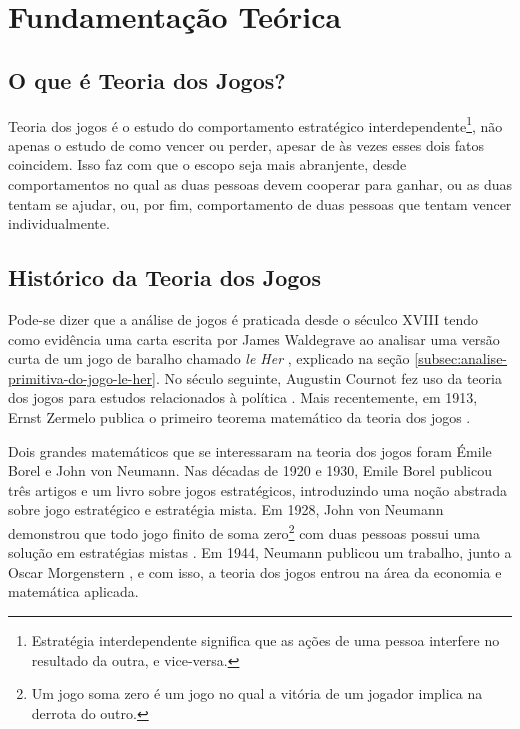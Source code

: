 \chapter[Fundamentação Teórica]{Fundamentação Teórica}
\label{cha:fundamentacao-teorica}

\section{O que é Teoria dos Jogos?}
\label{sec:o-que-e-teoria-dos-jogos}

Teoria dos jogos é o estudo do comportamento estratégico interdependente\footnote{Estratégia interdependente significa que as ações de uma pessoa interfere no resultado da outra, e vice-versa.}\cite{spaniel_2011}, não apenas o estudo de como vencer ou perder, apesar de às vezes esses dois fatos coincidem. Isso faz com que o escopo seja mais abranjente, desde comportamentos no qual as duas pessoas devem cooperar para ganhar, ou as duas tentam se ajudar, ou, por fim, comportamento de duas pessoas que tentam vencer individualmente.

\section{Histórico da Teoria dos Jogos}
\label{sec:historico-da-teoria-dos-jogos}

Pode-se dizer que a análise de jogos é praticada desde o séculco XVIII tendo como evidência uma carta escrita por James Waldegrave ao analisar uma versão curta de um jogo de baralho chamado \emph{le Her} \cite{Prague_severalmilestones}, explicado na seção \ref{subsec:analise-primitiva-do-jogo-le-her}. No século seguinte, Augustin Cournot fez uso da teoria dos jogos para estudos relacionados à política \cite{cournot_1838}. Mais recentemente, em 1913, Ernst Zermelo publica o primeiro teorema matemático da teoria dos jogos \cite{zermelo_1913}.

Dois grandes matemáticos que se interessaram na teoria dos jogos foram Émile Borel e John von Neumann. Nas décadas de 1920 e 1930, Emile Borel publicou três artigos \cite{borel_1921} \cite{borel_1924} \cite{borel_1927} e um livro \cite{borel_1938} sobre jogos estratégicos, introduzindo uma noção abstrada sobre jogo estratégico e estratégia mista. Em 1928, John von Neumann demonstrou que todo jogo finito de soma zero\footnote{Um jogo soma zero é um jogo no qual a vitória de um jogador implica na derrota do outro.} com duas pessoas possui uma solução em estratégias mistas \cite{neumann_1928}. Em 1944, Neumann publicou um trabalho, junto a Oscar Morgenstern \cite{neumann_1944}, e com isso, a teoria dos jogos entrou na área da economia e matemática aplicada.

